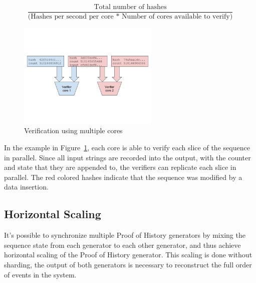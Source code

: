 \documentclass[12pt]{article}
\begin{document}
\[
\frac{\textrm{Total number of hashes}}{\textrm{(Hashes per second per core * Number of cores available to verify)}}
\]

\begin{figure}
  \begin{center}
    \centering
    \includegraphics[width=0.6\textwidth]{figures/fig_4.png}
    \caption[Figure 4]{Verification using multiple cores\label{fig:poh_verify}}
  \end{center}
  \end{figure}

In the example in Figure~\ref{fig:poh_verify}, each core is able to verify each slice of the sequence in parallel. Since all input strings are recorded into the output, with the counter and state that they are appended to, the verifiers can replicate each slice in parallel.  The red colored hashes indicate that the sequence was modified by a data insertion.

\subsection{Horizontal Scaling}\label{poh:scale}
It's possible to synchronize multiple Proof of History generators by mixing the sequence state from each generator to each other generator, and thus achieve horizontal scaling of the Proof of History generator.  This scaling is done without sharding, the output of both generators is necessary to reconstruct the full order of events in the system.
\end{document}
